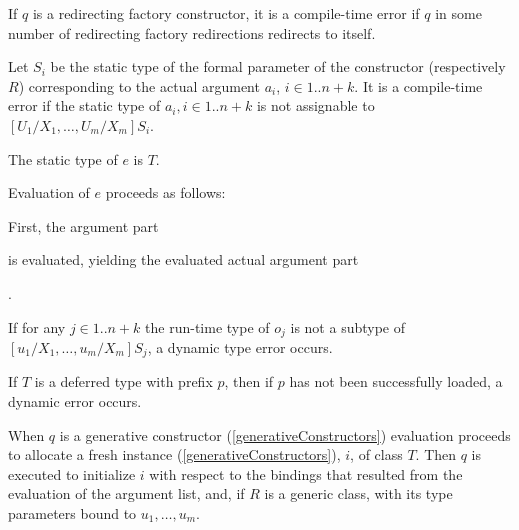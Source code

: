 \documentclass[makeidx]{article}
\begin{document}
\LMHash{}%
If $q$ is a redirecting factory constructor,
it is a compile-time error if $q$ in some number of
redirecting factory redirections redirects to itself.

\LMHash{}%
Let $S_i$ be the static type of
the formal parameter of the constructor  (respectively $R$)
corresponding to the actual argument $a_i$, $i \in 1 .. n+k$.
It is a compile-time error if the static type of
$a_i, i \in 1 .. n + k$
is not assignable to $[U_1/X_1, \ldots, U_m/X_m]S_i$.

\LMHash{}%
The static type of $e$ is $T$.

\LMHash{}%
Evaluation of $e$ proceeds as follows:

\LMHash{}%
First, the argument part


\noindent
is evaluated, yielding the evaluated actual argument part

.

\noindent
{}
If for any
$j \in 1 .. n + k$
the run-time type of $o_j$ is not a subtype of
$[u_1/X_1, \ldots, u_m/X_m]S_j$,
a dynamic type error occurs.

\LMHash{}%
If $T$ is a deferred type with prefix $p$, then if $p$ has not been successfully loaded, a dynamic error occurs.

\LMHash{}%
When $q$ is a generative constructor
(\ref{generativeConstructors})
evaluation proceeds to allocate a fresh instance
(\ref{generativeConstructors}), $i$, of class $T$.
Then $q$ is executed to initialize $i$ with respect to
the bindings that resulted from the evaluation of the argument list, and,
if $R$ is a generic class,
with its type parameters bound to $u_1, \ldots, u_m$.
\end{document}
